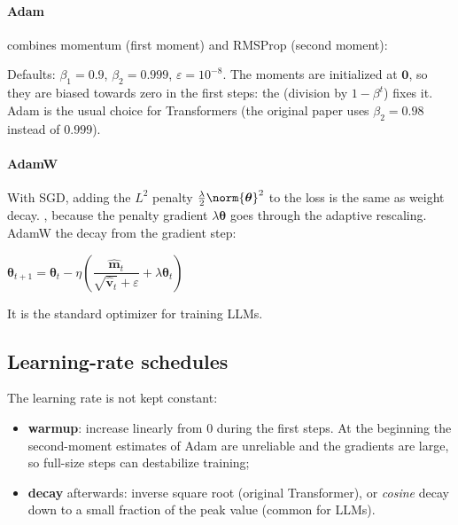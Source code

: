 \paragraph{Adam} combines momentum (first moment) and RMSProp (second moment):
\begin{center}
\end{center}
Defaults: $\beta_{1}=0.9$, $\beta_{2}=0.999$, $\varepsilon=10^{-8}$. The moments are
initialized at $\bm{0}$, so they are biased towards zero in the first steps: the
 (division by $1-\beta^{t}$) fixes it. Adam is the usual choice for
Transformers (the original paper uses $\beta_{2}=0.98$ instead of $0.999$).

\paragraph{AdamW} With SGD, adding the $L^{2}$ penalty $\frac{\lambda}{2}\norm{\bm{\theta}}^{2}$
to the loss is the same as weight decay. , because the penalty
gradient $\lambda\bm{\theta}$ goes through the adaptive rescaling. AdamW  the
decay from the gradient step:
\begin{center}
    $\bm{\theta}_{t+1} = \bm{\theta}_{t} - \eta\left(
    \dfrac{\hat{\bm{m}}_{t}}{\sqrt{\hat{\bm{v}}_{t}}+\varepsilon} + \lambda\bm{\theta}_{t}
    \right)$
\end{center}
It is the standard optimizer for training LLMs.

\subsection{Learning-rate schedules}
The learning rate is not kept constant:
\begin{itemize}
    \item \textbf{warmup}: increase linearly from $0$ during the first steps. At the
        beginning the second-moment estimates of Adam are unreliable and the gradients are
        large, so full-size steps can destabilize training;
    \item \textbf{decay} afterwards: inverse square root (original Transformer), or
        \emph{cosine} decay down to a small fraction of the peak value (common for LLMs).
\end{itemize}

